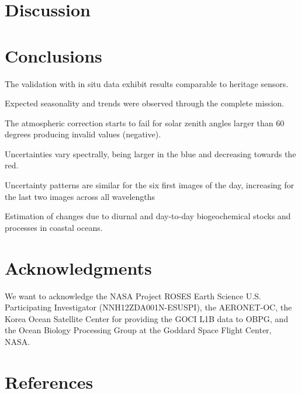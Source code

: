 \documentclass[onecolumn,3p,letterpaper,11pt]{elsarticle}
\begin{document}
\section{Discussion}

\section{Conclusions}

The validation with in situ data exhibit results comparable to heritage sensors.

Expected seasonality and trends were observed through the complete mission.

The atmospheric correction starts to fail for solar zenith angles larger than 60 degrees producing invalid values (negative). 

Uncertainties vary spectrally, being larger in the blue and decreasing towards the red.

Uncertainty patterns are similar for the six first images of the day, increasing for the last two images across all wavelengths

Estimation of changes due to diurnal and day-to-day biogeochemical stocks and processes in coastal oceans.


\section*{Acknowledgments}
\vspace{-.2cm}
We want to acknowledge the NASA Project ROSES Earth Science U.S. Participating Investigator (NNH12ZDA001N-ESUSPI), the AERONET-OC, the Korea Ocean Satellite Center for providing the GOCI L1B data to OBPG, and the Ocean Biology Processing Group at the Goddard Space Flight Center, NASA. 

\section*{References}

\end{document}
